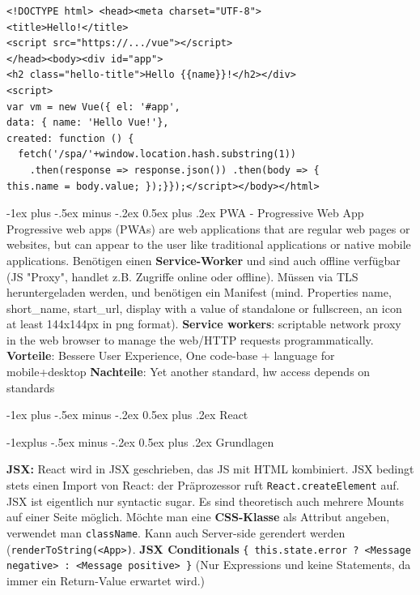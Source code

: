 \documentclass[a4paper, fontsize=6pt]{scrartcl}
\makeatletter
\renewcommand{\section}{\@startsection{section}{1}{0mm}%
    {-1ex plus -.5ex minus -.2ex}%
    {0.5ex plus .2ex}%
    {\normalfont\large\bfseries}}
\renewcommand{\subsection}{\@startsection{subsection}{2}{0mm}%
    {-1explus -.5ex minus -.2ex}%
    {0.5ex plus .2ex}%
    {\normalfont\normalsize\bfseries}}
\newcommand{\html}[1]{\texttt{#1}}
\newcommand{\js}[1]{\texttt{#1}}
\makeatother
\begin{document}
\begin{multicols*}{5}
\begin{verbatim}
<!DOCTYPE html> <head><meta charset="UTF-8">
<title>Hello!</title>
<script src="https://.../vue"></script>
</head><body><div id="app">
<h2 class="hello-title">Hello {{name}}!</h2></div>
<script>
var vm = new Vue({ el: '#app',
data: { name: 'Hello Vue!'}, 
created: function () {
  fetch('/spa/'+window.location.hash.substring(1))
    .then(response => response.json()) .then(body => {
this.name = body.value; });}});</script></body></html>
\end{verbatim}

\section{PWA - Progressive Web App}
Progressive web apps (PWAs) are web applications that are regular web pages or websites, but can appear to the user like traditional applications or native mobile applications. Benötigen einen \textbf{Service-Worker} und sind auch offline verfügbar (JS "Proxy", handlet z.B. Zugriffe online oder offline). Müssen via TLS heruntergeladen werden, und benötigen ein Manifest (mind. Properties name, short\_name, start\_url, display with a value of standalone or fullscreen, an icon at least 144x144px in png format). \textbf{Service workers}: scriptable network proxy in the web browser to manage the web/HTTP requests programmatically. \textbf{Vorteile}: Bessere User Experience, One code-base + language for mobile+desktop \textbf{Nachteile}: Yet another standard, hw access depends on standards

\section{React}

\subsection{Grundlagen}

\textbf{JSX:} React wird in JSX geschrieben, das JS mit HTML kombiniert. JSX bedingt stets einen Import von React: der Präprozessor ruft \js{React.createElement} auf. JSX ist eigentlich nur syntactic sugar. Es sind theoretisch auch mehrere Mounts auf einer Seite möglich. Möchte man eine \textbf{CSS-Klasse} als Attribut angeben, verwendet man \html{className}. Kann auch Server-side gerendert werden (\js{renderToString(<App>)}. \textbf{JSX Conditionals} \js{\{ this.state.error ? <Message negative> : <Message positive> \}} (Nur Expressions und keine Statements, da immer ein Return-Value erwartet wird.)


\end{multicols*}
\end{document}
